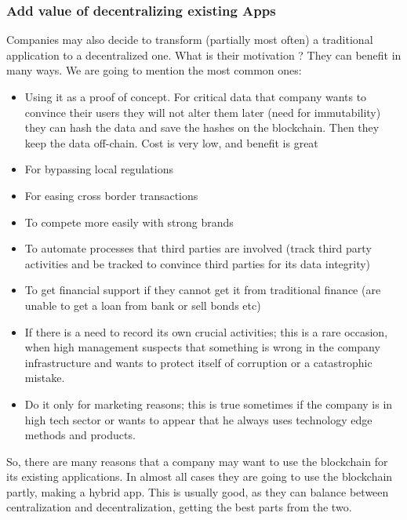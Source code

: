 \documentclass{article}
\begin{document}
\subsubsection{Add value of decentralizing existing Apps}
Companies may also decide to transform (partially most often) a traditional application to a decentralized one. What is their motivation ? They can benefit in many ways. We are going to mention the most common ones:
\begin{itemize}
\item Using it as a proof of concept. For critical data that company wants to convince their users they will not alter them later (need for immutability) they can hash the data and save the hashes on the blockchain. Then they keep the data off-chain. Cost is very low, and benefit is great
\item For bypassing local regulations
\item For easing cross border transactions
\item To compete more easily with strong brands
\item To automate processes that third parties are involved (track third party activities and be tracked to convince third parties for its data integrity)
\item To get financial support if they cannot get it from traditional finance (are unable to get a loan from bank or sell bonds etc)
\item If there is a need to record its own crucial activities; this is a rare occasion, when high management suspects that something is wrong in the company infrastructure and wants to protect itself of corruption or a catastrophic mistake.
\item Do it only for marketing reasons; this is true sometimes if the company is in high tech sector or wants to appear that he always uses technology edge methods and products.
\end{itemize}
So, there are many reasons that a company may want to use the blockchain for its existing applications. In almost all cases they are going to use the blockchain partly, making a hybrid app. This is usually good, as they can balance between centralization and decentralization, getting the best parts from the two.
\end{document}
